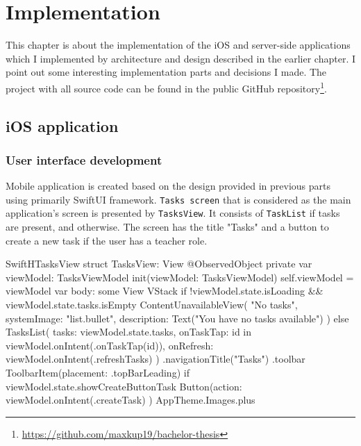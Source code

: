 \documentclass[
  biblatex = false,
  language=english,
  figures=false,
  sourcecodes,
  glossaries,
  index
]{kidiplom}
\begin{document}
\section{Implementation}
This chapter is about the implementation of the iOS and server-side applications which I implemented by architecture and design described in the earlier chapter. I point out some interesting implementation parts and decisions I made. The project with all source code can be found in the public GitHub repository\footnote{\url{https://github.com/maxkup19/bachelor-thesis}}.

\subsection{iOS application}
\subsubsection{User interface development}
Mobile application is created based on the design provided in previous parts using primarily SwiftUI framework. \texttt{Tasks screen} that is considered as the main application's screen is presented by \texttt{TasksView}. It consists of \texttt{TaskList} if tasks are present, and  otherwise. The screen has the title "Tasks" and a button to create a new task if the user has a teacher role.

\FloatBarrier
\begin{kicode}{Swift}{H}{TasksView}
struct TasksView: View {
    @ObservedObject private var viewModel: TasksViewModel
    init(viewModel: TasksViewModel) {
        self.viewModel = viewModel
    }
    var body: some View {
        VStack {
            if !viewModel.state.isLoading && viewModel.state.tasks.isEmpty {
                ContentUnavailableView(
                    "No tasks",
                    systemImage: "list.bullet",
                    description: Text("You have no tasks available")
                )
            } else {
                TasksList(
                    tasks: viewModel.state.tasks,
                    onTaskTap: { id in viewModel.onIntent(.onTaskTap(id))},
                    onRefresh: { viewModel.onIntent(.refreshTasks) }
                )
            }
        }
        .navigationTitle("Tasks")
        .toolbar {
            ToolbarItem(placement: .topBarLeading) {
                if viewModel.state.showCreateButtonTask {
                    Button(action: { viewModel.onIntent(.createTask) }) {
                        AppTheme.Images.plus
                    }
                }
            }
        }
    }
}
\end{kicode}
\FloatBarrier
\end{document}
